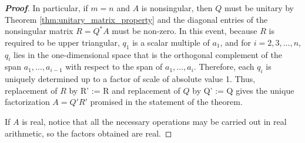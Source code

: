 \begin{proof}[\bf Proof]
In particular, if $m=n$ and $A$ is nonsingular, then $Q$ must be unitary by Theorem \ref{thm:unitary_matrix_property} and the diagonal entries of the nonsingular matrix $R = Q^*A$ must be non-zero.
In this event, because $R$ is required to be upper triangular, $q_1$ is a scalar multiple of $a_1$, and for $i=2,3,\dots,n$, $q_i$ lies in the one-dimensional space that is the orthogonal complement
of the span $a_1,\dots,a_{i-1}$ with respect to the span of $a_1,\dots,a_i$. Therefore, each $q_i$ is uniquely determined up to a factor of scale of absolute value 1. Thus, replacement of $R$ by
\be
R' := \diag{} R
\ee
and replacement of $Q$ by
\be
Q' := Q\diag{}
\ee
gives the unique factorization $A = Q'R'$ promised in the statement of the theorem.


If $A$ is real, notice that all the necessary operations may be carried out in real arithmetic, so the factors obtained are real.
\end{proof}

